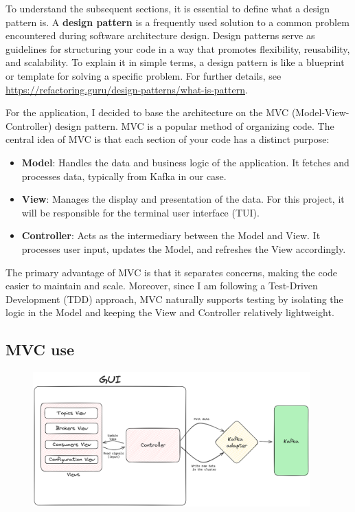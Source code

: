 \documentclass[10pt , a4paper]{report}
\begin{document}
To understand the subsequent sections, it is essential to define what a design pattern is. A \textbf{design pattern} is a frequently used solution to a common problem encountered during software architecture design. Design patterns serve as guidelines for structuring your code in a way that promotes flexibility, reusability, and scalability. To explain it in simple terms, a design pattern is like a blueprint or template for solving a specific problem. For further details, see \url{https://refactoring.guru/design-patterns/what-is-pattern}.

For the application, I decided to base the architecture on the MVC (Model-View-Controller) design pattern. MVC is a popular method of organizing code. The central idea of MVC is that each section of your code has a distinct purpose:
\begin{itemize}
    \item \textbf{Model}: Handles the data and business logic of the application. It fetches and processes data, typically from Kafka in our case.
    \item \textbf{View}: Manages the display and presentation of the data. For this project, it will be responsible for the terminal user interface (TUI).
    \item \textbf{Controller}: Acts as the intermediary between the Model and View. It processes user input, updates the Model, and refreshes the View accordingly.
\end{itemize}

The primary advantage of MVC is that it separates concerns, making the code easier to maintain and scale. Moreover, since I am following a Test-Driven Development (TDD) approach, MVC naturally supports testing by isolating the logic in the Model and keeping the View and Controller relatively lightweight.

\subsection{MVC use}

\begin{figure}[htbp]
  \begin{center}
    \includegraphics[width=0.95\textwidth]{imgs/InitialArchitecture.png}
  \end{center}
  \caption{}\label{fig:mvc_diagram}
\end{figure}
\end{document}
